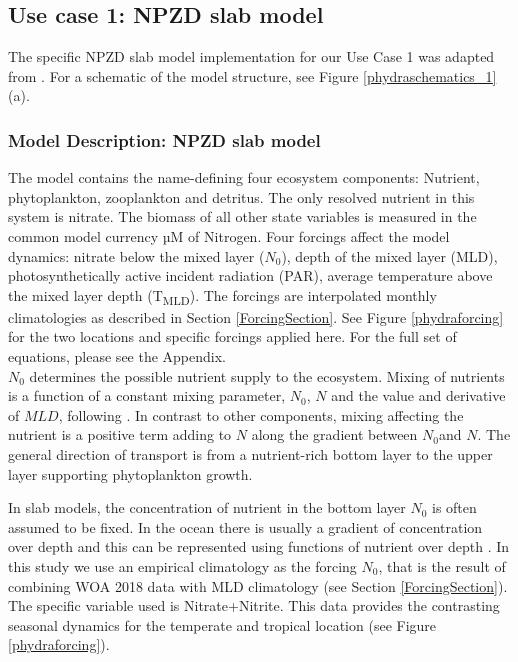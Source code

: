 \documentclass[journal abbreviation, manuscript]{copernicus}
\begin{document}
\subsection{Use case 1: NPZD slab model}

The specific NPZD slab model implementation for our Use Case 1 was adapted from \citet{Anderson2015c}. For a schematic of the model structure, see Figure \ref{phydraschematics_1} (a).

\subsubsection{Model Description: NPZD slab model}
The model contains the name-defining four ecosystem components: Nutrient, phytoplankton, zooplankton and detritus. The only resolved nutrient in this system is nitrate. The biomass of all other state variables is measured in the common model currency \unit{µM} of Nitrogen. Four forcings affect the model dynamics: nitrate below the mixed layer ($N_0$), depth of the mixed layer (MLD), photosynthetically active incident radiation (PAR), average temperature above the mixed layer depth (\unit{T_{MLD}}). The forcings are interpolated monthly climatologies as described in Section \ref{ForcingSection}. See Figure \ref{phydraforcing} for the two locations and specific forcings applied here.
For the full set of equations, please see the Appendix.\\

$N_0$ determines the possible nutrient supply to the ecosystem. Mixing of nutrients is a function of a constant mixing parameter, $N_0$, $N$ and the value and derivative of $MLD$, following \citet{Evans1985ACycles}. In contrast to other components, mixing affecting the nutrient is a positive term adding to $N$ along the gradient between $N_0$and $N$. The general direction of transport is from a nutrient-rich bottom layer to the upper layer supporting phytoplankton growth.

In slab models, the concentration of nutrient in the bottom layer $N_0$ is often assumed to be fixed. In the ocean there is usually a gradient of concentration over depth and this can be represented using functions of nutrient over depth \citep{Frost1987GrazingSpp., Fasham1995VariationsAnalysis}. In this study we use an empirical climatology as the forcing $N_0$, that is the result of combining WOA 2018 data with MLD climatology (see Section \ref{ForcingSection}). The specific variable used is Nitrate+Nitrite. This data provides the contrasting seasonal dynamics for the temperate and tropical location (see Figure \ref{phydraforcing}).
\end{document}
